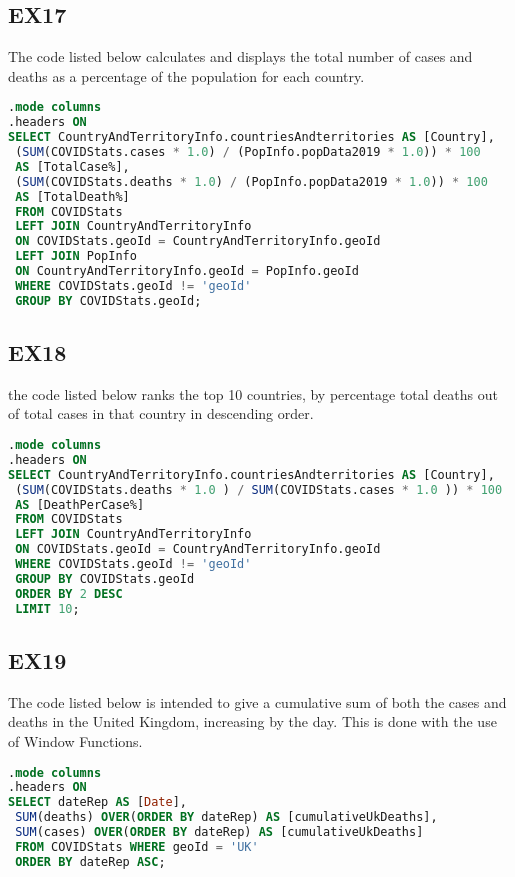 \documentclass{report}
\begin{document}
\subsection{EX17}
The code listed below calculates and displays the total number of cases and deaths as a percentage of the population for each country.
\begin{lstlisting}[language=SQL]
.mode columns
.headers ON
SELECT CountryAndTerritoryInfo.countriesAndterritories AS [Country],
 (SUM(COVIDStats.cases * 1.0) / (PopInfo.popData2019 * 1.0)) * 100
 AS [TotalCase%],
 (SUM(COVIDStats.deaths * 1.0) / (PopInfo.popData2019 * 1.0)) * 100 
 AS [TotalDeath%]
 FROM COVIDStats
 LEFT JOIN CountryAndTerritoryInfo 
 ON COVIDStats.geoId = CountryAndTerritoryInfo.geoId
 LEFT JOIN PopInfo 
 ON CountryAndTerritoryInfo.geoId = PopInfo.geoId
 WHERE COVIDStats.geoId != 'geoId'
 GROUP BY COVIDStats.geoId;
\end{lstlisting}

\subsection{EX18}
the code listed below ranks the top 10 countries, by percentage total deaths out of total cases in that country in descending order.
\begin{lstlisting}[language=SQL]
.mode columns
.headers ON
SELECT CountryAndTerritoryInfo.countriesAndterritories AS [Country],
 (SUM(COVIDStats.deaths * 1.0 ) / SUM(COVIDStats.cases * 1.0 )) * 100
 AS [DeathPerCase%]
 FROM COVIDStats
 LEFT JOIN CountryAndTerritoryInfo
 ON COVIDStats.geoId = CountryAndTerritoryInfo.geoId
 WHERE COVIDStats.geoId != 'geoId'
 GROUP BY COVIDStats.geoId
 ORDER BY 2 DESC
 LIMIT 10;
\end{lstlisting}

\subsection{EX19}
The code listed below is intended to give a cumulative sum of both the cases and deaths in the United Kingdom, increasing by the day. This is done with the use of Window Functions.
\begin{lstlisting}[language=SQL]
.mode columns
.headers ON
SELECT dateRep AS [Date],
 SUM(deaths) OVER(ORDER BY dateRep) AS [cumulativeUkDeaths],
 SUM(cases) OVER(ORDER BY dateRep) AS [cumulativeUkDeaths]
 FROM COVIDStats WHERE geoId = 'UK'
 ORDER BY dateRep ASC;
\end{lstlisting}
\end{document}

